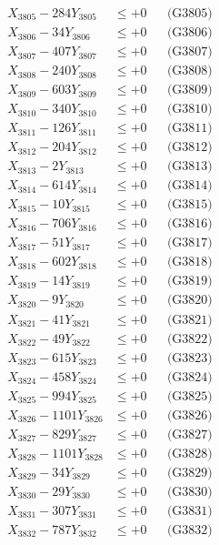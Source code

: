 \documentclass[a4paper,10pt]{article}
\begin{document}
{\begin{align}
X_{3805} - 284Y_{3805} &\leq +0 && \text{(G3805)} \\
X_{3806} - 34Y_{3806} &\leq +0 && \text{(G3806)} \\
X_{3807} - 407Y_{3807} &\leq +0 && \text{(G3807)} \\
X_{3808} - 240Y_{3808} &\leq +0 && \text{(G3808)} \\
X_{3809} - 603Y_{3809} &\leq +0 && \text{(G3809)} \\
X_{3810} - 340Y_{3810} &\leq +0 && \text{(G3810)} \\
\allowbreak
X_{3811} - 126Y_{3811} &\leq +0 && \text{(G3811)} \\
X_{3812} - 204Y_{3812} &\leq +0 && \text{(G3812)} \\
X_{3813} - 2Y_{3813} &\leq +0 && \text{(G3813)} \\
X_{3814} - 614Y_{3814} &\leq +0 && \text{(G3814)} \\
X_{3815} - 10Y_{3815} &\leq +0 && \text{(G3815)} \\
X_{3816} - 706Y_{3816} &\leq +0 && \text{(G3816)} \\
X_{3817} - 51Y_{3817} &\leq +0 && \text{(G3817)} \\
X_{3818} - 602Y_{3818} &\leq +0 && \text{(G3818)} \\
X_{3819} - 14Y_{3819} &\leq +0 && \text{(G3819)} \\
X_{3820} - 9Y_{3820} &\leq +0 && \text{(G3820)} \\
\allowbreak
X_{3821} - 41Y_{3821} &\leq +0 && \text{(G3821)} \\
X_{3822} - 49Y_{3822} &\leq +0 && \text{(G3822)} \\
X_{3823} - 615Y_{3823} &\leq +0 && \text{(G3823)} \\
X_{3824} - 458Y_{3824} &\leq +0 && \text{(G3824)} \\
X_{3825} - 994Y_{3825} &\leq +0 && \text{(G3825)} \\
X_{3826} - 1101Y_{3826} &\leq +0 && \text{(G3826)} \\
X_{3827} - 829Y_{3827} &\leq +0 && \text{(G3827)} \\
X_{3828} - 1101Y_{3828} &\leq +0 && \text{(G3828)} \\
X_{3829} - 34Y_{3829} &\leq +0 && \text{(G3829)} \\
X_{3830} - 29Y_{3830} &\leq +0 && \text{(G3830)} \\
\allowbreak
X_{3831} - 307Y_{3831} &\leq +0 && \text{(G3831)} \\
X_{3832} - 787Y_{3832} &\leq +0 && \text{(G3832)} \\

\end{align}}
\end{document}
